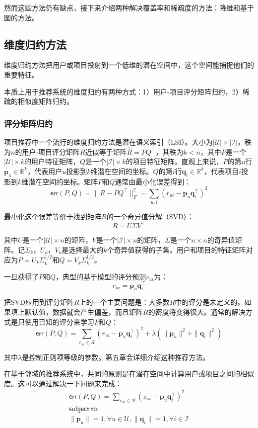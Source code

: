 \documentclass{article}
\begin{document}
 然而这些方法仍有缺点，接下来介绍两种解决覆盖率和稀疏度的方法：降维和基于图的方法。

 \subsection{维度归约方法}
 维度归约方法把用户或项目投射到一个低维的潜在空间中，这个空间能捕捉他们的重要特征。

 本质上用于推荐系统的维度归约有两种方式：1）用户-项目评分矩阵归约，2）稀疏的相似度矩阵归约。

 \subsubsection{评分矩阵归约}
 项目推荐中一个流行的维度归约方法是潜在语义索引（LSI）。大小为$|\mathcal{U}|\times|\mathcal{I}|$，秩为$n$的用户-项目评分矩阵$R$近似等于矩阵$\hat{R}=PQ^{\top}$，其秩为$k<n$，其中$P$是一个$|\mathcal{U}|\times k$的用户特征矩阵，$Q$是一个$|\mathcal{I}|\times k$的项目特征矩阵。直观上来说，$P$的第$u$行$\mathbf{p}_u\in\mathbb{R}^k$，代表用户$u$投影到$k$维潜在空间的坐标。$Q$的第$i$行$\mathbf{q}_i\in\mathbb{R}^k$，代表项目$i$投影到$k$维潜在空间的坐标。矩阵$P$和$Q$通常由最小化误差得到：
 $$  \mathsf{err}(P,Q)=\|R-PQ^{\top}\|^2_F=\mathop{\sum}\limits_{u,i}(r_{ui}-\mathbf{p}_u\mathbf{q}_i^{\top})^2 $$

 最小化这个误差等价于找到矩阵$R$的一个奇异值分解（SVD）：
 $$ R=U\Sigma V^{\top} $$

 其中$U$是一个$|\mathcal{U}|\times n$的矩阵，$V$是一个$|\mathcal{I}|\times n$的矩阵，$\Sigma$是一个$n\times n$的奇异值矩阵。记$\Sigma_k$，$U_k$，$V_k$是选择最大的$k$个奇异值获得的子集。用户和项目的特征矩阵对应为$P=U_k\Sigma_k^{1/2}$和$Q=V_k\Sigma_k^{1/2}$。

 一旦获得了$P$和$Q$，典型的基于模型的评分预测$r_{ui}$为：
 $$ r_{ui}=\mathbf{p}_u\mathbf{q}_i^{\top} $$

 把SVD应用到评分矩阵$R$上的一个主要问题是：大多数$R$中的评分是未定义的。如果填上默认值，数据就会产生偏差，而且矩阵$R$的密度将变得很大。通常的解决方式是只使用已知的评分来学习$P$和$Q$：
 $$ \mathsf{err}(P,Q)=\mathop{\sum}\limits_{r_{ui}\in\mathcal{R}}(r_{ui}-\mathbf{p}_u\mathbf{q}_i^{\top})^2+\lambda(\|\mathbf{p}_u\|^2+\|\mathbf{q}_i\|^2) $$

 其中$\lambda$是控制正则项等级的参数。第五章会详细介绍这种推荐方法。

 在基于邻域的推荐系统中，共同的原则是在潜在空间中计算用户或项目之间的相似度。这可以通过解决一下问题来完成：
 \[
 \begin{array}{l}
 \mathsf{err}(P,Q)=\mathop{\sum}\limits_{r_{ui}\in\mathcal{R}}(z_{ui}-\mathbf{p}_u\mathbf{q}_i^{\top})^2 \\
 \mathsf{subject\ to:}\\
 \|\mathbf{p}_u\|=1,\forall u\in\mathcal{U},\|\mathbf{q}_i\|=1,\forall i\in\mathcal{I}
 \end{array}
 \]
\end{document}
